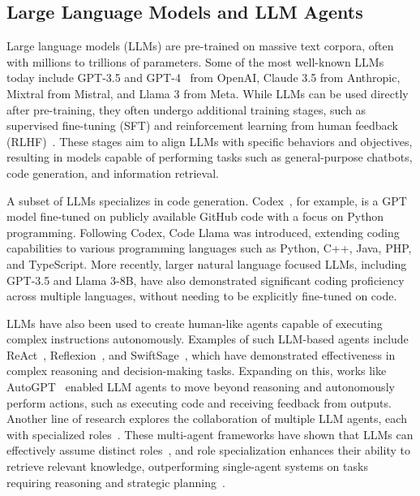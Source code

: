 \label{sec:related_works}
\subsection{Large Language Models and LLM Agents}
Large language models (LLMs) are pre-trained on massive text corpora, often with millions to trillions of parameters. Some of the most well-known LLMs today include GPT-3.5 and GPT-4~\citep{openai2024gpt4} from OpenAI, Claude 3.5 from Anthropic, Mixtral from Mistral, and Llama 3 from Meta. While LLMs can be used directly after pre-training, they often undergo additional training stages, such as supervised fine-tuning (SFT) and reinforcement learning from human feedback (RLHF)~\citep{long2022rlhf}. These stages aim to align LLMs with specific behaviors and objectives, resulting in models capable of performing tasks such as general-purpose chatbots, code generation, and information retrieval.

A subset of LLMs specializes in code generation. Codex~\citep{chen2021codex}, for example, is a GPT model fine-tuned on publicly available GitHub code with a focus on Python programming. Following Codex, Code Llama was introduced, extending coding capabilities to various programming languages such as Python, C++, Java, PHP, and TypeScript. More recently, larger natural language focused LLMs, including GPT-3.5 and Llama 3-8B, have also demonstrated significant coding proficiency across multiple languages, without needing to be explicitly fine-tuned on code.

LLMs have also been used to create human-like agents capable of executing complex instructions autonomously. Examples of such LLM-based agents include ReAct~\citep{yao2023react}, Reflexion~\citep{shinn2023reflexion}, and SwiftSage~\cite{lin2023swiftsage}, which have demonstrated effectiveness in complex reasoning and decision-making tasks. Expanding on this, works like AutoGPT~\citep{autogpt} enabled LLM agents to move beyond reasoning and autonomously perform actions, such as executing code and receiving feedback from outputs. Another line of research explores the collaboration of multiple LLM agents, each with specialized roles~\citep{hong2024metagpt, du2024team, park2023simulacra}. These multi-agent frameworks have shown that LLMs can effectively assume distinct roles~\citep{tseng2024roleplay}, and role specialization enhances their ability to retrieve relevant knowledge, outperforming single-agent systems on tasks requiring reasoning and strategic planning~\citep{sreedhar2024singlemulti}.

